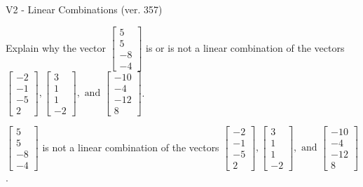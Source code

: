 \begin{exercise}
  \begin{exerciseTitle}V2 - Linear Combinations (ver. 357)\end{exerciseTitle}
  \begin{exerciseStatement}
    Explain why the vector \(\left[\begin{array}{c}
5 \\
5 \\
-8 \\
-4
\end{array}\right]\)  is or is not a linear 
	combination of the vectors \(\left[\begin{array}{c}
-2 \\
-1 \\
-5 \\
2
\end{array}\right] , \left[\begin{array}{c}
3 \\
1 \\
1 \\
-2
\end{array}\right] , \text{ and } \left[\begin{array}{c}
-10 \\
-4 \\
-12 \\
8
\end{array}\right]\).
	


  \end{exerciseStatement}
  \begin{exerciseAnswer}
   \(\left[\begin{array}{c}
5 \\
5 \\
-8 \\
-4
\end{array}\right]\) 
  	 is not  
	a linear combination of the vectors \(\left[\begin{array}{c}
-2 \\
-1 \\
-5 \\
2
\end{array}\right] , \left[\begin{array}{c}
3 \\
1 \\
1 \\
-2
\end{array}\right] , \text{ and } \left[\begin{array}{c}
-10 \\
-4 \\
-12 \\
8
\end{array}\right]\).

	
  


  \end{exerciseAnswer}
\end{exercise}